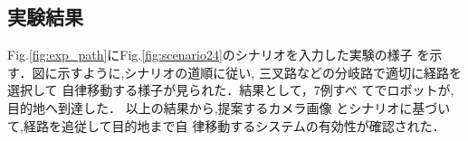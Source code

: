 \documentclass{sice-si}
\begin{document}
\subsection{実験結果}
Fig.\ref{fig:exp_path}にFig.\ref{fig:scenario24}のシナリオを入力した実験の様子
を示す．図に示すように,シナリオの道順に従い,
三叉路などの分岐路で適切に経路を選択して
自律移動する様子が見られた．結果として，7例すべ
てでロボットが,目的地へ到達した．
以上の結果から,提案するカメラ画像
とシナリオに基づいて,経路を追従して目的地まで自
律移動するシステムの有効性が確認された．
\end{document}
